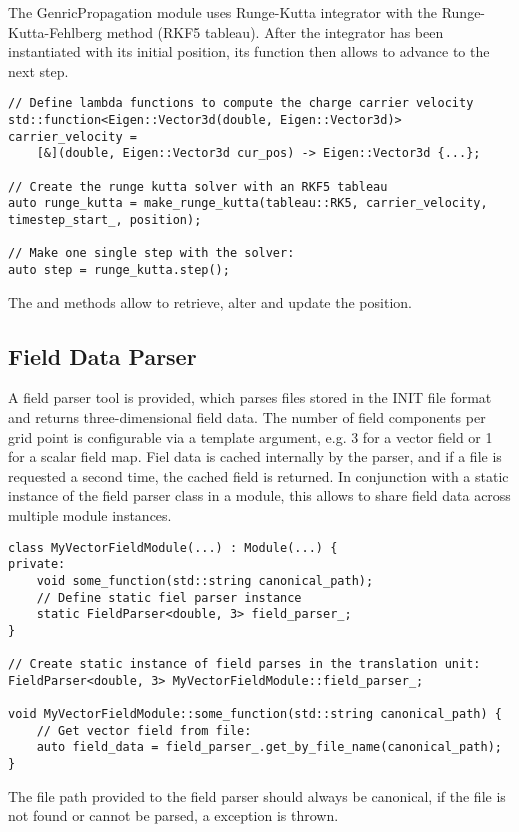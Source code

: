 The GenricPropagation module uses Runge-Kutta integrator with the Runge-Kutta-Fehlberg method (RKF5 tableau).
After the integrator has been instantiated with its initial position, its  function then allows to advance to the next step.
\begin{verbatim}
// Define lambda functions to compute the charge carrier velocity
std::function<Eigen::Vector3d(double, Eigen::Vector3d)> carrier_velocity =
    [&](double, Eigen::Vector3d cur_pos) -> Eigen::Vector3d {...};

// Create the runge kutta solver with an RKF5 tableau
auto runge_kutta = make_runge_kutta(tableau::RK5, carrier_velocity, timestep_start_, position);

// Make one single step with the solver:
auto step = runge_kutta.step();
\end{verbatim}

The  and  methods allow to retrieve, alter and update the position.

\subsection{Field Data Parser}
A field parser tool is provided, which parses files stored in the INIT file format and returns three-dimensional field data.
The number of field components per grid point is configurable via a template argument, e.g. 3 for a vector field or 1 for a scalar field map.
Fiel data is cached internally by the parser, and if a file is requested a second time, the cached field is returned.
In conjunction with a static instance of the field parser class in a module, this allows to share field data across multiple module instances.

\begin{verbatim}
class MyVectorFieldModule(...) : Module(...) {
private:
    void some_function(std::string canonical_path);
    // Define static fiel parser instance
    static FieldParser<double, 3> field_parser_;
}

// Create static instance of field parses in the translation unit:
FieldParser<double, 3> MyVectorFieldModule::field_parser_;

void MyVectorFieldModule::some_function(std::string canonical_path) {
    // Get vector field from file:
    auto field_data = field_parser_.get_by_file_name(canonical_path);
}
\end{verbatim}

The file path provided to the field parser should always be canonical, if the file is not found or cannot be parsed, a  exception is thrown.

\label{sec:tcad_electric_field_converter}

\label{sec:root_analysis_macros}
